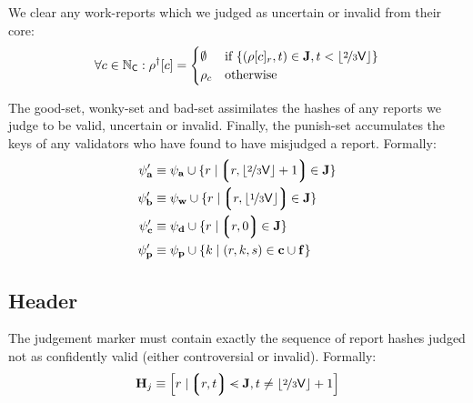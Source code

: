 We clear any work-reports which we judged as uncertain or invalid from their core:
\begin{equation}
  \forall c \in \N_\mathsf{C} : \rho^\dagger[c] = \begin{cases}
    \none &\when \{ (\rho[c]_r, t) \in \mathbf{J}, t < \floor{\nicefrac{2}{3}\mathsf{V}} \} \\
    \rho_c &\otherwise
  \end{cases}
\end{equation}

The good-set, wonky-set and bad-set assimilates the hashes of any reports we judge to be valid, uncertain or invalid. Finally, the punish-set accumulates the keys of any validators who have found to have misjudged a report. Formally:
\begin{align}
  \psi'_\mathbf{a} &\equiv \goodset \cup \{r \mid \tup{r, \floor{\nicefrac{2}{3}\mathsf{V}} + 1} \in \mathbf{J} \} \\
  \psi'_\mathbf{b} &\equiv \wonkyset \cup \{r \mid \tup{r, \floor{\nicefrac{1}{3}\mathsf{V}}} \in \mathbf{J} \} \\
  \psi'_\mathbf{c} &\equiv \badset \cup \{r \mid \tup{r, 0} \in \mathbf{J} \} \\
  \psi'_\mathbf{p} &\equiv \punishset \cup \{ k \mid (r, k, s) \in \mathbf{c} \cup \mathbf{f} \}
\end{align}

\subsection{Header}\label{sec:judgementmarker}

The judgement marker must contain exactly the sequence of report hashes judged not as confidently valid (\ie either controversial or invalid). Formally:
\begin{equation}
  \mathbf{H}_j \equiv \sq{r \mid \tup{r, t} \orderedin \mathbf{J}, t \ne \floor{\nicefrac{2}{3}\mathsf{V}} + 1}
\end{equation}
